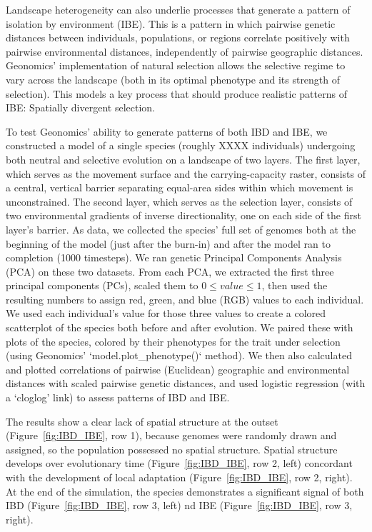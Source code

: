 ﻿\documentclass{article}
\begin{document}
Landscape heterogeneity can also underlie processes that generate a pattern of isolation
by environment (IBE).
This is a pattern in which pairwise genetic distances between
individuals, populations, or regions correlate positively with pairwise environmental distances, independently of pairwise geographic distances.
Geonomics' implementation of natural selection allows the selective regime to vary
across the landscape (both in its optimal phenotype and its strength of selection).
This models a key process that should produce realistic patterns of IBE: Spatially divergent selection.

To test Geonomics' ability to generate patterns of both IBD and IBE,
we constructed a model of a single species (roughly XXXX individuals)
undergoing both neutral and selective evolution on a landscape of two layers.
The first layer, which serves as the movement surface and the carrying-capacity raster,
consists of a central, vertical barrier separating equal-area sides within which
movement is unconstrained. 
The second layer, which serves as the selection layer, consists of two environmental gradients of inverse directionality, one on each side of the first layer's barrier.
As data, we collected the species' full set of genomes both at the beginning of the model
(just after the burn-in) and after the model ran to completion (1000 timesteps).
We ran genetic Principal Components Analysis (PCA) on these two datasets.
From each PCA, we extracted the first three principal components (PCs),
scaled them to $0 \leq value\leq 1$, then used the resulting numbers
to assign red, green, and blue (RGB) values to each individual.
We used each individual's value for those three values to create a colored
scatterplot of the species both before and after evolution.
We paired these with plots of the species, colored by their phenotypes for the trait
under selection (using Geonomics' `model.plot\_phenotype()` method).
We then also calculated and plotted correlations of pairwise (Euclidean) geographic
and environmental distances with scaled pairwise genetic distances, and used
logistic regression (with a `cloglog' link) to assess patterns of IBD and IBE.

The results show a clear lack of spatial structure at the outset
(Figure~\ref{fig:IBD_IBE}, row 1), because genomes were randomly drawn and assigned,
so the population possessed no spatial structure.
Spatial structure develops over evolutionary time
(Figure~\ref{fig:IBD_IBE}, row 2, left) concordant with the development
of local adaptation (Figure~\ref{fig:IBD_IBE}, row 2, right).
At the end of the simulation, the species demonstrates a
significant signal of both IBD (Figure~\ref{fig:IBD_IBE}, row 3, left)
nd IBE (Figure~\ref{fig:IBD_IBE}, row 3, right).
\end{document}
